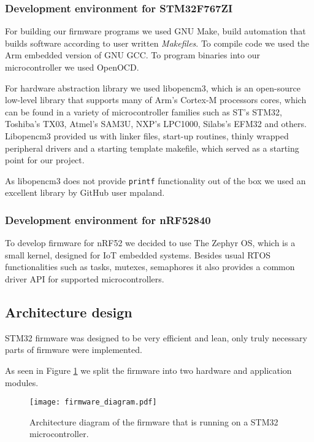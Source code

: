\subsubsection{ Development environment for STM32F767ZI}

For building our firmware programs we used GNU Make, build automation that builds software according to user written \textit{Makefiles}.
To compile code we used the Arm embedded version of GNU GCC.
To program binaries into our microcontroller we used OpenOCD.

For hardware abstraction library we used libopencm3, which is an open-source low-level library that supports many of Arm's Cortex-M processors cores, which can be found in a variety of microcontroller families such as ST's STM32, Toshiba's TX03, Atmel's SAM3U, NXP's LPC1000, Silabs's EFM32 and others.
Libopencm3 provided us with linker files, start-up routines, thinly wrapped peripheral drivers and a starting template makefile, which served as a starting point for our project.

As libopencm3 does not provide \verb|printf| functionality out of the box we used an excellent library by GitHub user mpaland\cite{printf_lib}.


\subsubsection{ Development environment for nRF52840}

To develop firmware for nRF52 we decided to use The Zephyr OS, which is a small kernel, designed for IoT embedded systems.
Besides usual RTOS functionalities such as tasks, mutexes, semaphores it also provides a common driver API for supported microcontrollers.


\subsection{ Architecture design}

STM32 firmware was designed to be very efficient and lean, only truly necessary parts of firmware were implemented.

As seen in Figure \ref{firmware_diagram} we split the firmware into two hardware and application modules.

\begin{figure}[ht]
        \centering
        \texttt{[image: firmware\_diagram.pdf]} 
        \caption{ Architecture diagram of the firmware that is running on a STM32 microcontroller.} 
        \label{firmware_diagram}
\end{figure}

